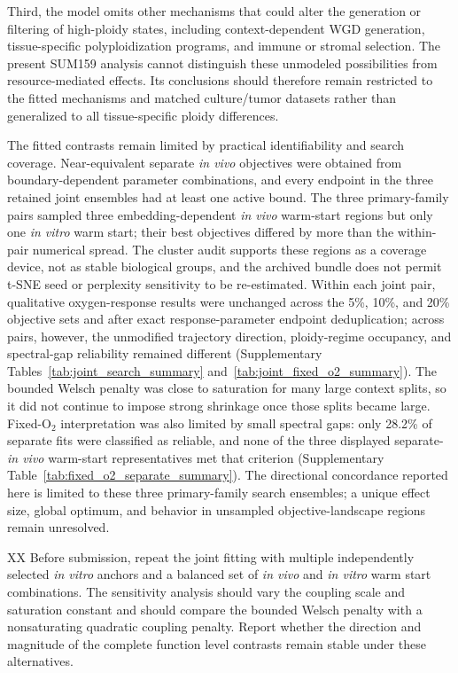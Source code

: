 \documentclass[11pt]{article}
\begin{document}
Third, the model omits other mechanisms that could alter the generation or filtering of high-ploidy states, including context-dependent WGD generation, tissue-specific polyploidization programs, and immune or stromal selection. The present SUM159 analysis cannot distinguish these unmodeled possibilities from resource-mediated effects. Its conclusions should therefore remain restricted to the fitted mechanisms and matched culture/tumor datasets rather than generalized to all tissue-specific ploidy differences.

The fitted contrasts remain limited by practical identifiability and search coverage. Near-equivalent separate \textit{in vivo} objectives were obtained from boundary-dependent parameter combinations, and every endpoint in the three retained joint ensembles had at least one active bound. The three primary-family pairs sampled three embedding-dependent \textit{in vivo} warm-start regions but only one \textit{in vitro} warm start; their best objectives differed by more than the within-pair numerical spread. The cluster audit supports these regions as a coverage device, not as stable biological groups, and the archived bundle does not permit t-SNE seed or perplexity sensitivity to be re-estimated. Within each joint pair, qualitative oxygen-response results were unchanged across the 5\%, 10\%, and 20\% objective sets and after exact response-parameter endpoint deduplication; across pairs, however, the unmodified trajectory direction, ploidy-regime occupancy, and spectral-gap reliability remained different (Supplementary Tables~\ref{tab:joint_search_summary} and~\ref{tab:joint_fixed_o2_summary}). The bounded Welsch penalty was close to saturation for many large context splits, so it did not continue to impose strong shrinkage once those splits became large. Fixed-O$_2$ interpretation was also limited by small spectral gaps: only 28.2\% of separate fits were classified as reliable, and none of the three displayed separate-\textit{in vivo} warm-start representatives met that criterion (Supplementary Table~\ref{tab:fixed_o2_separate_summary}). The directional concordance reported here is limited to these three primary-family search ensembles; a unique effect size, global optimum, and behavior in unsampled objective-landscape regions remain unresolved.

XX Before submission, repeat the joint fitting with multiple independently selected \textit{in vitro} anchors and a balanced set of \textit{in vivo} and \textit{in vitro} warm start combinations. The sensitivity analysis should vary the coupling scale and saturation constant and should compare the bounded Welsch penalty with a nonsaturating quadratic coupling penalty. Report whether the direction and magnitude of the complete function level contrasts remain stable under these alternatives.
\end{document}

